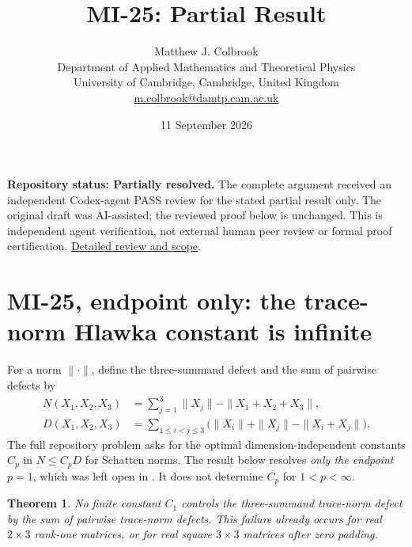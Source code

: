 \documentclass[10pt,a4paper]{article}
\title{MI-25: Partial Result}
\author{Matthew J. Colbrook\\
\small Department of Applied Mathematics and Theoretical Physics\\
\small University of Cambridge, Cambridge, United Kingdom\\
\small\href{mailto:m.colbrook@damtp.cam.ac.uk}{m.colbrook@damtp.cam.ac.uk}}
\date{11 September 2026}
\newtheorem{theorem}{Theorem}[section]
\theoremstyle{remark}
\begin{document}
\maketitle
\textbf{Repository status: Partially resolved.}
The complete argument received an independent Codex-agent PASS review
for the stated partial result only.
The original draft was AI-assisted; the reviewed proof below is unchanged.
This is independent agent verification, not external human peer review or
formal proof certification. \href{https://github.com/ajt60gaibb/OpenProblemsInNLA/blob/main/references/colbrook-matrix-2026-09-11/verification/reviews/MI-25-review.md}{Detailed review and scope}.
\par\medskip
\section{MI-25, endpoint only: the trace-norm Hlawka constant is infinite}
\label{sec:mi25}

For a norm $\|\cdot\|$, define the three-summand defect and the sum of pairwise defects by
\begin{align*}
 N(X_1,X_2,X_3)&=\sum_{j=1}^3\|X_j\|-\|X_1+X_2+X_3\|,\\
 D(X_1,X_2,X_3)&=\sum_{1\leq i<j\leq3}
 \bigl(\|X_i\|+\|X_j\|-\|X_i+X_j\|\bigr).
\end{align*}
The full repository problem asks for the optimal dimension-independent constants $C_p$ in $N\leq C_pD$ for Schatten norms. The result below resolves \emph{only the endpoint $p=1$}, which was left open in \cite[Problem 7]{AK2012}. It does not determine $C_p$ for $1<p<\infty$.

\begin{theorem}\label{thm:mi25}
No finite constant $C_1$ controls the three-summand trace-norm defect by the sum of pairwise trace-norm defects. This failure already occurs for real $2\times3$ rank-one matrices, or for real square $3\times3$ matrices after zero padding.
\end{theorem}
\end{document}
